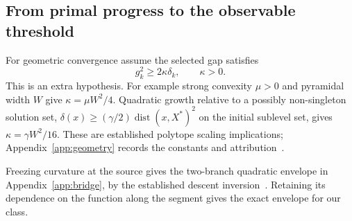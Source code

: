 \subsection{From primal progress to the observable threshold}
For geometric convergence assume the selected gap satisfies
\begin{equation}\label{eq:geometry}
 g_k^2\ge2\kappa\delta_k,\qquad\kappa>0.
\end{equation}
This is an extra hypothesis. For example strong convexity $\mu>0$
and pyramidal width $W$ give $\kappa=\mu W^2/4$.
Quadratic growth relative to a possibly non-singleton solution set,
$\delta(x)\ge(\gamma/2)\operatorname{dist}(x,X^*)^2$ on the initial
sublevel set, gives $\kappa=\gamma W^2/16$.
These are established polytope scaling implications;
Appendix~\ref{app:geometry} records the constants and
attribution~\cite{lacostejaggi,restartfw}.

Freezing curvature at the source gives the two-branch quadratic
envelope in Appendix~\ref{app:bridge}, by the established descent
inversion~\cite[Eq.~(15)]{lacoste2016}. Retaining its dependence on
the function along the segment gives the exact envelope for our class.

